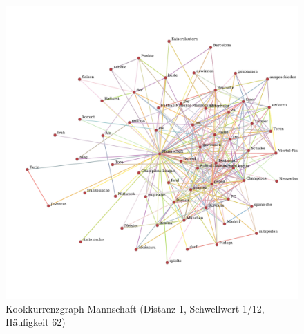 \documentclass[11pt, a4paper]{article}
\begin{document}
\begin{figure}[hp!]
    \centering
        \includegraphics[scale=.4]{../../data/results/cooc_nl/topwords/graph_Mannschaft.pdf}
    \caption{Kookkurrenzgraph Mannschaft (Distanz 1, Schwellwert 1/12, Häufigkeit 62)}
    \label{fig:hw-mannschaft}
\end{figure}

\end{document}
